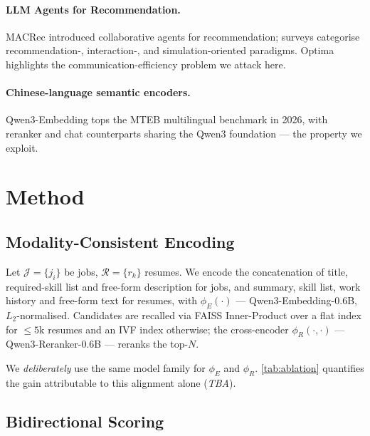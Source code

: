 \documentclass[11pt]{article}
\begin{document}
\paragraph{LLM Agents for Recommendation.} MACRec
\citep{Wang2024MACRec} introduced collaborative agents for
recommendation; surveys \citep{Peng2025AgentSurvey} categorise
recommendation-, interaction-, and simulation-oriented paradigms.
Optima \citep{Chen2025Optima} highlights the communication-efficiency
problem we attack here.

\paragraph{Chinese-language semantic encoders.} Qwen3-Embedding tops the
MTEB multilingual benchmark in 2026, with reranker and chat counterparts
sharing the Qwen3 foundation — the property we exploit.

\section{Method}
\label{sec:method}

\subsection{Modality-Consistent Encoding}
\label{sec:method-encoding}

Let $\mathcal{J}=\{j_i\}$ be jobs, $\mathcal{R}=\{r_k\}$ resumes. We
encode the concatenation of title, required-skill list and free-form
description for jobs, and summary, skill list, work history and
free-form text for resumes, with $\phi_E(\cdot)$ —
Qwen3-Embedding-0.6B, $L_2$-normalised. Candidates are recalled via
FAISS Inner-Product over a flat index for $\leq 5\text{k}$ resumes and
an IVF index otherwise; the cross-encoder
$\phi_R(\cdot,\cdot)$ — Qwen3-Reranker-0.6B — reranks the top-$N$.

We \emph{deliberately} use the same model family for $\phi_E$ and
$\phi_R$. \cref{tab:ablation} quantifies the gain attributable to
this alignment alone (\textit{TBA}).

\subsection{Bidirectional Scoring}
\label{sec:method-scoring}
\end{document}
